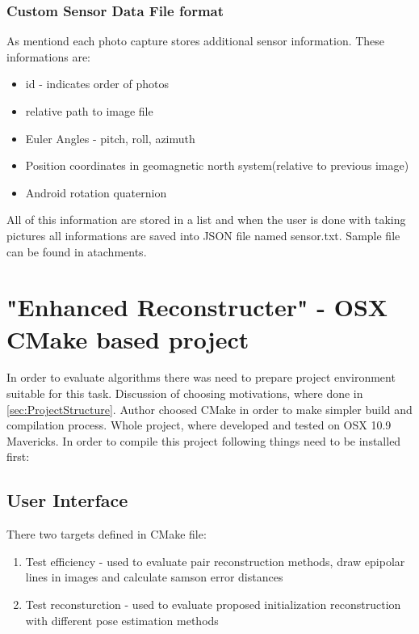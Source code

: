 \subsubsection{Custom Sensor Data File format}
As mentiond each photo capture stores additional sensor information. These informations are: 
\begin{itemize}
\item id - indicates order of photos
\item relative path to image file
\item Euler Angles - pitch, roll, azimuth %
\item Position coordinates in geomagnetic north system(relative to previous image)
\item Android rotation quaternion %
\end{itemize} 
All of this information are stored in a list and when the user is done with taking pictures all informations are saved into JSON file named sensor.txt. Sample file can be found in atachments.\pagebreak
\section{"Enhanced Reconstructer" - OSX CMake based project}
In order to evaluate algorithms there was need to prepare project environment suitable for this task. Discussion of choosing motivations, where done in \ref{sec:ProjectStructure}. Author choosed CMake in order to make simpler build and compilation process. Whole project, where developed and tested on OSX 10.9 Mavericks. In order to compile this project following things need to be installed first:
\subsection{User Interface}
There two targets defined in CMake file:
\begin{enumerate}
\item Test efficiency - used to evaluate pair reconstruction methods, draw epipolar lines in images and calculate samson error distances
\item Test reconsturction - used to evaluate proposed initialization reconstruction with different pose estimation methods
\end{enumerate}
